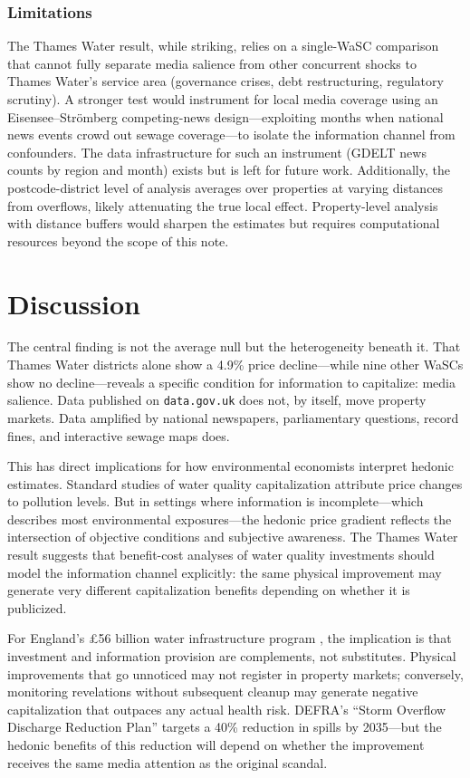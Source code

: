 \documentclass[12pt]{article}
\begin{document}
\subsubsection*{Limitations} The Thames Water result, while striking, relies on a single-WaSC comparison that cannot fully separate media salience from other concurrent shocks to Thames Water's service area (governance crises, debt restructuring, regulatory scrutiny). A stronger test would instrument for local media coverage using an Eisensee--Str\"omberg competing-news design---exploiting months when national news events crowd out sewage coverage---to isolate the information channel from confounders. The data infrastructure for such an instrument (GDELT news counts by region and month) exists but is left for future work. Additionally, the postcode-district level of analysis averages over properties at varying distances from overflows, likely attenuating the true local effect. Property-level analysis with distance buffers would sharpen the estimates but requires computational resources beyond the scope of this note.


\section{Discussion}
\label{sec:discussion}

The central finding is not the average null but the heterogeneity beneath it. That Thames Water districts alone show a 4.9\% price decline---while nine other WaSCs show no decline---reveals a specific condition for information to capitalize: media salience. Data published on \texttt{data.gov.uk} does not, by itself, move property markets. Data amplified by national newspapers, parliamentary questions, record fines, and interactive sewage maps does.

This has direct implications for how environmental economists interpret hedonic estimates. Standard studies of water quality capitalization \citep{keiser2019, chay2005} attribute price changes to pollution levels. But in settings where information is incomplete---which describes most environmental exposures---the hedonic price gradient reflects the intersection of objective conditions and subjective awareness. The Thames Water result suggests that benefit-cost analyses of water quality investments should model the information channel explicitly: the same physical improvement may generate very different capitalization benefits depending on whether it is publicized.

For England's \pounds56 billion water infrastructure program \citep{ofwat2024}, the implication is that investment and information provision are complements, not substitutes. Physical improvements that go unnoticed may not register in property markets; conversely, monitoring revelations without subsequent cleanup may generate negative capitalization that outpaces any actual health risk. DEFRA's ``Storm Overflow Discharge Reduction Plan'' \citep{defra2023} targets a 40\% reduction in spills by 2035---but the hedonic benefits of this reduction will depend on whether the improvement receives the same media attention as the original scandal.
\end{document}
